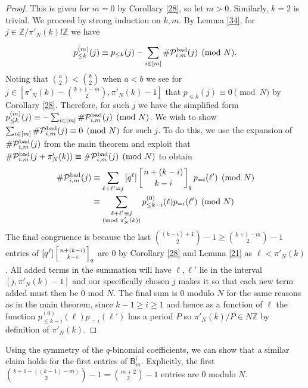 \documentclass[12pt]{article}
\newcommand{\Z}{\mathbb{Z}}
\newcommand{\qbinom}[2]{\left[{#1 \atop #2}\right]_q}
\begin{document}
\begin{proof}
This is given for $m=0$ by Corollary \ref{28}, so let $m>0$. Similarly, $k=2$ is trivial. We proceed by strong induction on $k,m$. By Lemma \ref{34}, for $j \in \mathbb{Z}/\pi'_N(k)l\mathbb{Z}$ we have

\[p_{\le k}^{(m)}(j) \equiv p_{\le k}(j)- \sum_{i\in[m]}{\#\mathcal{P}_{i,m}^{\textup{bad}}}(j) \pmod{N}.\]
Noting that $\binom{a}{2} < \binom{b}{2}$ when $a<b$ we see for $j\in[\pi'_N(k) - \binom{k+1-m}{2}, \pi'_N(k)-1]$ that $p_{\le k}(j)\equiv 0 \pmod{N}$ by Corollary \ref{28}. Therefore, for such $j$ we have the simplified form
$p_{\le k}^{(m)}(j) \equiv -\sum_{i\in [m]}{\#\mathcal{P}_{i,m}^{\textup{bad}}(j)} \pmod{N}$. We wish to show $\sum_{i\in [m]}{\#\mathcal{P}_{i,m}^{\textup{bad}}(j)} \equiv 0 \pmod{N}$ for such $j$. To do this, we use the expansion of $\#\mathcal{P}_{i,m}^{\textup{bad}}(j)$ from the main theorem and exploit that $\#\mathcal{P}^{\textup{bad}}_{i,m}(j+\pi'_N(k))\equiv \#\mathcal{P}^{\textup{bad}}_{i,m}(j) \pmod{N}$ to obtain
\begin{align*}
\#\mathcal{P}_{i,m}^{\textup{bad}}(j) &\equiv \sum_{\ell+\ell'=j}{[q^\ell]\qbinom{n+(k-i)}{k-i}p_{=i}(\ell')} \pmod{N} \\
&\equiv \sum_{\substack{\ell+\ell' \equiv j \\ (\textup{mod }\pi'_N(k))}}{p_{\le k-i}^{(0)}(\ell)p_{=i}(\ell')} \pmod{N}
\end{align*}
The final congruence is because the last $\binom{(k-i)+1}{2}-1 \ge \binom{k+1-m}{2}-1$ entries of $[q^\ell]\qbinom{n+(k-i)}{k-i}$ are $0$ by Corollary \ref{28} and Lemma \ref{21} as $\ell < \pi'_N(k)$. All added terms in the summation will have $\ell, \ell'$ lie in the interval $[j, \pi'_N(k)-1]$ and our specifically chosen $j$ makes it so that each new term added must then be $0$ mod $N$. The final sum is $0$ modulo $N$ for the same reasons as in the main theorem, since $k-1\ge i\ge 1$ and hence as a function of $\ell$ the function $p_{\le k-i}^{(0)}(\ell)p_{=i}(\ell')$ has a period $P$ so $\pi'_N(k)/P\in N\Z$ by definition of $\pi'_N(k)$.
\end{proof}

\begin{remark}
Using the symmetry of the $q$-binomial coefficients, we can show that a similar claim holds for the first entries of $\mathsf{B}_m^i$. Explicitly, the first $\binom{k+1-((k-1)-m)}{2}-1=\binom{m+2}{2}-1$ entries are $0$ modulo $N$.
\end{remark}
\end{document}
